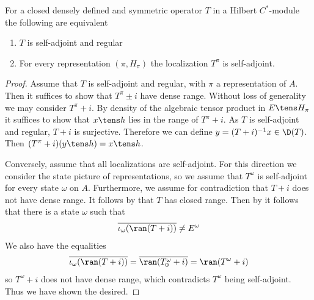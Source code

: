 \begin{theorem}
	For a closed densely defined and symmetric operator $T$ in a Hilbert $C^*$-module the following are equivalent
	\begin{enumerate}
		\item $T$ is self-adjoint and regular
		\item For every representation $(\pi,H_{\pi})$ the localization $T^\pi$ is self-adjoint. 
	\end{enumerate}
\end{theorem}
\begin{proof}
	Assume that $T$ is self-adjoint and regular, with $\pi$ a representation of $A$. Then it suffices to show that $T^\pi\pm i$ have dense range. Without loss of generality we may consider $T^\pi+i$. By density of the algebraic tensor product in $E\tens H_\pi$ it suffices to show that $x\tens h$ lies in the range of $T^\pi+i$. As $T$ is self-adjoint and regular, $T+i$ is surjective. Therefore we can define $y=(T+i)^{-1}x\in \D(T)$. Then $(T^\pi+i)(y\tens h)=x\tens h$. 
	
	Conversely, assume that all localizations are self-adjoint. For this direction we consider the state picture of representations, so we assume that $T^\omega$ is self-adjoint for every state $\omega$ on $A$. Furthermore, we assume for contradiction that $T+i$ does not have dense range. It follows by  that $T$ has closed range. Then by  it follows that there is a state $\omega$ such that 
	\begin{align*}
		\overline{\iota_\omega(\ran(T+i))}\neq E^\omega
	\end{align*}
	We also have the equalities
	\begin{align*}
		\overline{\iota_\omega(\ran(T+i))}=\overline{\ran(T_0^\omega+i)}=\ran(T^\omega+i)
	\end{align*}
	so $T^\omega+i$ does not have dense range, which contradicts $T^\omega$ being self-adjoint. Thus we have shown the desired. 
\end{proof}
